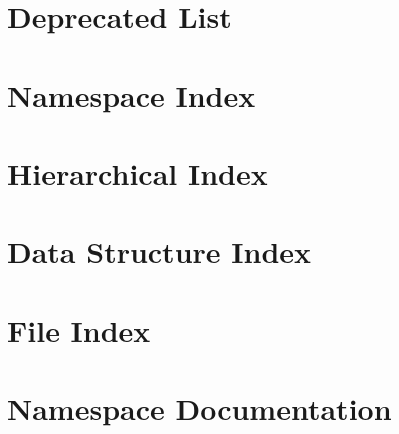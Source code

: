 \documentclass[twoside]{book}
\newcommand{\+}{\discretionary{\mbox{\scriptsize$\hookleftarrow$}}{}{}}
\begin{document}
\chapter{Deprecated List}
\label{deprecated}

\chapter{Namespace Index}

\chapter{Hierarchical Index}

\chapter{Data Structure Index}

\chapter{File Index}

\chapter{Namespace Documentation}























\end{document}
